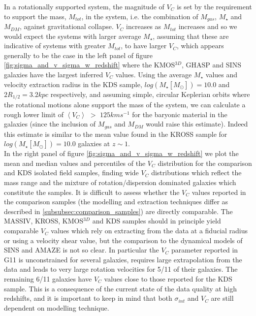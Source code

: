 \documentclass[fleqn,usenatbib]{mn2e}
\begin{document}
In a rotationally supported system, the magnitude of $V_{C}$ is set by the requirement to support the mass, $M_{tot}$, in the system, i.e. the combination of $M_{gas}$, $M_{\star}$ and $M_{DM}$, against gravitational collapse.
$V_{C}$ increases as $M_{tot}$ increases and so we would expect the systems with larger average $M_{\star}$, assuming that these are indicative of systems with greater $M_{tot}$, to have larger $V_{C}$, which appears generally to be the case in the left panel of figure \ref{fig:sigma_and_v_sigma_w_redshift} where the KMOS$^{3D}$, GHASP and SINS galaxies have the largest inferred $V_{C}$ values.
Using the average $M_{\star}$ values and velocity extraction radius in the KDS sample, $log(M_{\star}[M_{\odot}])=10.0$ and $2R_{1/2} = 3.2kpc$ respectively, and assuming simple, circular Keplerian orbits where the rotational motions alone support the mass of the system, we can calculate a rough lower limit of $\left<V_{C}\right>$ $>$ $125kms^{-1}$ for the baryonic material in the galaxies (since the inclusion of $M_{gas}$ and $M_{DM}$ would raise this estimate).
Indeed this estimate is similar to the mean value found in the KROSS sample for $log(M_{\star}[M_{\odot}])=10.0$ galaxies at $z\sim1$. \\


In the right panel of figure \ref{fig:sigma_and_v_sigma_w_redshift} we plot the mean and median values and percentiles of the $V_{C}$ distribution for the comparison and KDS isolated field samples, finding wide $V_{C}$ distributions which reflect the mass range and the mixture of rotation/dispersion dominated galaxies which constitute the samples.
It is difficult to assess whether the $V_{C}$ values reported in the comparison samples (the modelling and extraction techniques differ as described in \cref{subsubsec:comparison_samples}) are directly comparable.
The MASSIV, KROSS, KMOS$^{3D}$ and KDS samples should in principle yield comparable $V_{C}$ values which rely on extracting from the data at a fiducial radius or using a velocity shear value, but the comparison to the dynamical models of SINS and AMAZE is not so clear.
In particular the $V_{C}$ parameter reported in G11 is unconstrained for several galaxies, requires large extrapolation from the data and leads to very large rotation velocities for 5/11 of their galaxies.
The remaining 6/11 galaxies have $V_{C}$ values close to those reported for the KDS sample.
This is a consequence of the current state of the data quality at high redshifts, and it is important to keep in mind that both $\sigma_{int}$ and $V_{C}$ are still dependent on modelling technique. \\
\end{document}

